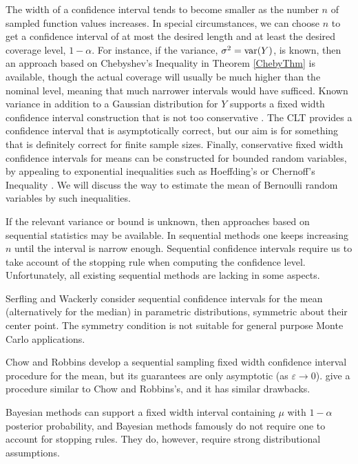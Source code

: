 \documentclass{iitthesis}
\theoremstyle{definition}
\begin{document}
The width of a confidence interval tends to become smaller as the number $n$ of sampled
function values increases. In special circumstances, we can choose $n$ to get a confidence interval of at most the desired length and at least the desired coverage level, $1-\alpha$. For instance, if the variance, $\sigma^2=\operatorname{var}(Y)$, is known, then an approach based on Chebyshev's Inequality in Theorem \ref{ChebyThm} is available, though the actual coverage will usually be much higher than the nominal level, meaning that much narrower intervals would have sufficed. Known variance in addition to a Gaussian distribution for $Y$ supports a fixed width confidence interval construction that is not too conservative \cite{stein45}. The CLT provides a confidence interval that is asymptotically correct, but our aim is for something that is definitely correct for finite sample sizes. Finally, conservative fixed width confidence intervals for means can be constructed for bounded random variables, by appealing to exponential inequalities such as Hoeffding's \cite{H63} or Chernoff's Inequality \cite{Chernoff52}. We will discuss the way to estimate the mean of Bernoulli random variables by such inequalities.

If the relevant variance or bound is unknown, then approaches based on sequential statistics \cite{Siegmund85} may be available.  In sequential methods one keeps increasing $n$ until the interval is narrow enough. Sequential confidence intervals require us to take account of the stopping rule when computing the confidence level. Unfortunately, all existing sequential methods are lacking in some aspects. 

Serfling and Wackerly \cite{SerflingaWackerlyb76} consider sequential confidence intervals for the mean (alternatively for the median) in parametric distributions, symmetric about their center point. The symmetry condition is not suitable for general purpose Monte Carlo applications.

Chow and Robbins\cite{ChowRobbins65} develop a sequential sampling fixed width confidence interval procedure for the mean, but its guarantees are only asymptotic (as $\varepsilon \to 0$). \cite{MukhDatta96} give a procedure similar to Chow and Robbins's, and it has similar drawbacks.

Bayesian methods can support a fixed width interval containing $\mu$ with $1-\alpha$ posterior probability, and
Bayesian methods famously do not require one to account for stopping rules. They do, however, require strong distributional assumptions.
\end{document}

